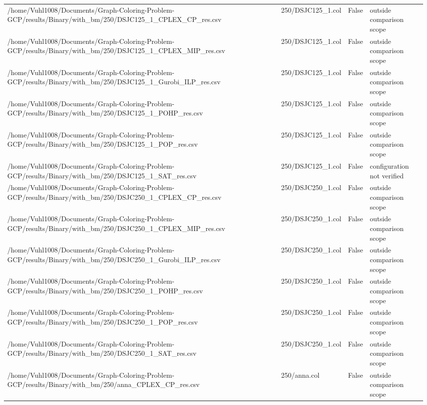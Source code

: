 \begin{table}[htbp]
\begin{tabular}{llll}
/home/Vuhl1008/Documents/Graph-Coloring-Problem-GCP/results/Binary/with\_bm/250/DSJC125\_1\_CPLEX\_CP\_res.csv & 250/DSJC125\_1.col & False & outside comparison scope \\
/home/Vuhl1008/Documents/Graph-Coloring-Problem-GCP/results/Binary/with\_bm/250/DSJC125\_1\_CPLEX\_MIP\_res.csv & 250/DSJC125\_1.col & False & outside comparison scope \\
/home/Vuhl1008/Documents/Graph-Coloring-Problem-GCP/results/Binary/with\_bm/250/DSJC125\_1\_Gurobi\_ILP\_res.csv & 250/DSJC125\_1.col & False & outside comparison scope \\
/home/Vuhl1008/Documents/Graph-Coloring-Problem-GCP/results/Binary/with\_bm/250/DSJC125\_1\_POHP\_res.csv & 250/DSJC125\_1.col & False & outside comparison scope \\
/home/Vuhl1008/Documents/Graph-Coloring-Problem-GCP/results/Binary/with\_bm/250/DSJC125\_1\_POP\_res.csv & 250/DSJC125\_1.col & False & outside comparison scope \\
/home/Vuhl1008/Documents/Graph-Coloring-Problem-GCP/results/Binary/with\_bm/250/DSJC125\_1\_SAT\_res.csv & 250/DSJC125\_1.col & False & configuration not verified \\
/home/Vuhl1008/Documents/Graph-Coloring-Problem-GCP/results/Binary/with\_bm/250/DSJC250\_1\_CPLEX\_CP\_res.csv & 250/DSJC250\_1.col & False & outside comparison scope \\
/home/Vuhl1008/Documents/Graph-Coloring-Problem-GCP/results/Binary/with\_bm/250/DSJC250\_1\_CPLEX\_MIP\_res.csv & 250/DSJC250\_1.col & False & outside comparison scope \\
/home/Vuhl1008/Documents/Graph-Coloring-Problem-GCP/results/Binary/with\_bm/250/DSJC250\_1\_Gurobi\_ILP\_res.csv & 250/DSJC250\_1.col & False & outside comparison scope \\
/home/Vuhl1008/Documents/Graph-Coloring-Problem-GCP/results/Binary/with\_bm/250/DSJC250\_1\_POHP\_res.csv & 250/DSJC250\_1.col & False & outside comparison scope \\
/home/Vuhl1008/Documents/Graph-Coloring-Problem-GCP/results/Binary/with\_bm/250/DSJC250\_1\_POP\_res.csv & 250/DSJC250\_1.col & False & outside comparison scope \\
/home/Vuhl1008/Documents/Graph-Coloring-Problem-GCP/results/Binary/with\_bm/250/DSJC250\_1\_SAT\_res.csv & 250/DSJC250\_1.col & False & outside comparison scope \\
/home/Vuhl1008/Documents/Graph-Coloring-Problem-GCP/results/Binary/with\_bm/250/anna\_CPLEX\_CP\_res.csv & 250/anna.col & False & outside comparison scope \\

\end{tabular}
\end{table}
